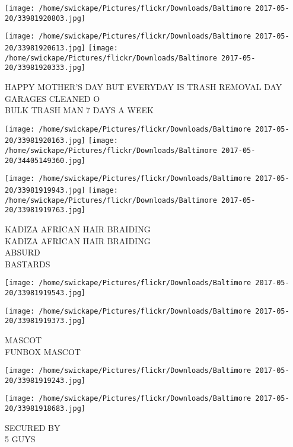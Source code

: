 \documentclass[10pt,letterpaper]{article}
\begin{document}
\texttt{[image: /home/swickape/Pictures/flickr/Downloads/Baltimore 2017-05-20/33981920803.jpg]}

\vspace{0.25in}
\texttt{[image: /home/swickape/Pictures/flickr/Downloads/Baltimore 2017-05-20/33981920613.jpg]}
\texttt{[image: /home/swickape/Pictures/flickr/Downloads/Baltimore 2017-05-20/33981920333.jpg]}

HAPPY MOTHER'S DAY BUT EVERYDAY IS TRASH REMOVAL DAY\\
GARAGES CLEANED O\\
BULK TRASH MAN 7 DAYS A WEEK\\
\pagebreak

\texttt{[image: /home/swickape/Pictures/flickr/Downloads/Baltimore 2017-05-20/33981920163.jpg]}
\texttt{[image: /home/swickape/Pictures/flickr/Downloads/Baltimore 2017-05-20/34405149360.jpg]}

\texttt{[image: /home/swickape/Pictures/flickr/Downloads/Baltimore 2017-05-20/33981919943.jpg]}
\texttt{[image: /home/swickape/Pictures/flickr/Downloads/Baltimore 2017-05-20/33981919763.jpg]}

KADIZA AFRICAN HAIR BRAIDING\\
KADIZA AFRICAN HAIR BRAIDING\\
ABSURD\\
BASTARDS\\
\pagebreak

\texttt{[image: /home/swickape/Pictures/flickr/Downloads/Baltimore 2017-05-20/33981919543.jpg]}

\vspace{0.25in}
\texttt{[image: /home/swickape/Pictures/flickr/Downloads/Baltimore 2017-05-20/33981919373.jpg]}

MASCOT\\
FUNBOX MASCOT\\
\pagebreak

\texttt{[image: /home/swickape/Pictures/flickr/Downloads/Baltimore 2017-05-20/33981919243.jpg]}

\vspace{0.25in}
\texttt{[image: /home/swickape/Pictures/flickr/Downloads/Baltimore 2017-05-20/33981918683.jpg]}

SECURED BY\\
5 GUYS\\
\pagebreak
\end{document}
